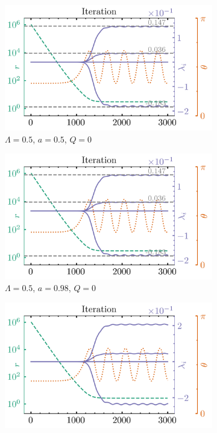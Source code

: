\documentclass[11pt, twocolumn]{article}
\begin{document}
\begin{figure}[ht!]
    \centering
    \begin{subfigure}[b]{\columnwidth}
        \centering
        \includegraphics[width=\textwidth]{asset/eigensystem_a_0.50_Q_0.00_lambda_0.50_pro.png}
        \caption{$\Lambda = 0.5$, $a = 0.5$, $Q = 0$}
    \end{subfigure}
    \begin{subfigure}[b]{\columnwidth}
        \centering
        \includegraphics[width=\textwidth]{asset/eigensystem_a_0.50_Q_0.00_lambda_0.50_pro.png}
        \caption{$\Lambda = 0.5$, $a = 0.98$, $Q = 0$}
    \end{subfigure}
    \begin{subfigure}[b]{\columnwidth}
        \centering
        \includegraphics[width=\textwidth]{asset/eigensystem_a_0.50_Q_0.50_lambda_0.50_pro.png}

\end{subfigure}
\end{figure}
\end{document}
